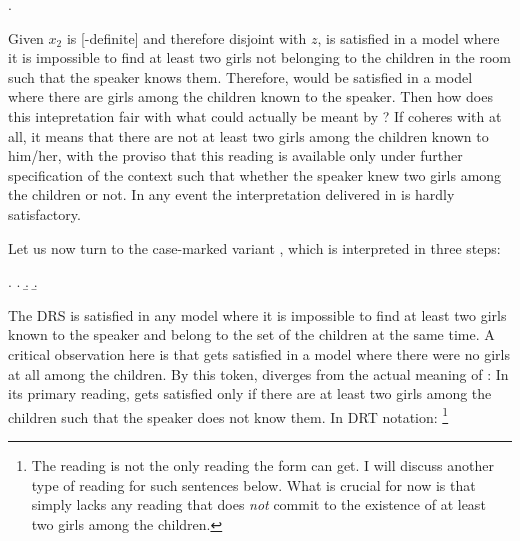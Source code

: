 \documentclass[11pt,a4paper]{article}
\begin{document}
\ex.\label{Exencnegzerodrs}

Given $x_2$ is [-definite] and therefore disjoint with $z$,
 is satisfied in a model where it is impossible to find
at least two girls not belonging to the children in the room such that the
speaker knows them. Therefore,  would be satisfied in a
model where there are girls among the children known to the speaker.  Then how
does this intepretation fair with what could actually be meant by
? If  coheres with 
at all, it means that there are not at least two girls among the children known
to him/her, with the proviso that this reading is available only under further
specification of the context such that whether the speaker knew two girls among
the children or not. In any event the interpretation delivered in
 is hardly satisfactory.

Let us now turn to the case-marked variant , which is
interpreted in three steps:

\ex.
\a.
\b.
\b.\label{Exencnegaccdrs}

The DRS  is satisfied in any model where it is impossible
to find at least two girls known to the speaker and belong to the set of the
children at the same time. A critical observation here is that
 gets satisfied in a model where there were no girls at
all among the children. By this token,  diverges from the
actual meaning of : In its primary reading,
 gets satisfied only if there are  at least two girls among
the children such that the speaker does not know them. In DRT notation:
\footnote{The reading  is not the only reading the form
 can get. I will discuss another type of reading for such
sentences below. What is crucial for now is that  simply
lacks any reading that does \emph{not} commit to the existence of at least two
girls among the children.}
\end{document}
